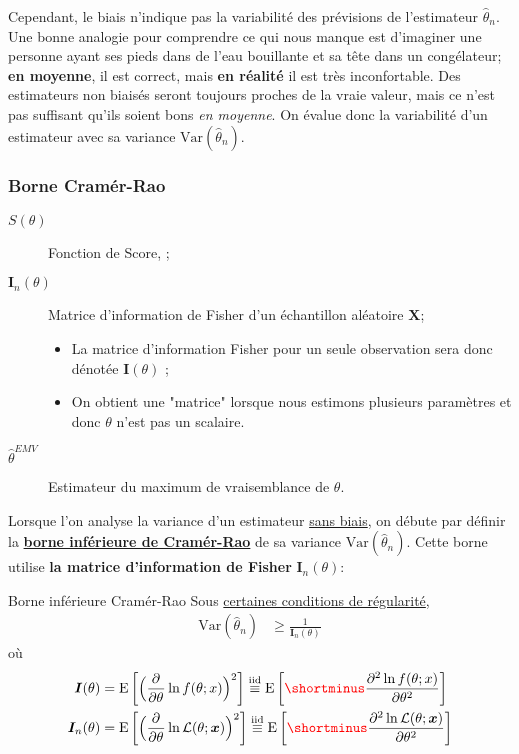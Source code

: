 \documentclass[10pt, french]{article}
\begin{document}
\begin{multicols*}{2}
Cependant, le biais n'indique pas la variabilité des prévisions de l'estimateur $\hat{\theta}_{n}$. Une bonne analogie pour comprendre ce qui nous manque est d’imaginer une personne ayant ses pieds dans de l'eau bouillante et sa tête dans un congélateur; \textbf{en moyenne}, il est correct, mais \textbf{en réalité} il est très inconfortable. Des estimateurs non biaisés seront toujours proches de la vraie valeur, mais ce n'est pas suffisant qu'ils soient bons \textit{en moyenne}. On évalue donc la variabilité d'un estimateur avec sa variance $\text{Var}(\hat{\theta}_{n})$.

\subsubsection{Borne Cramér-Rao}
\label{sec:cramer_rao}

\begin{distributions}[Notation]
\begin{description}
	\item[$S(\theta)$]	Fonction de Score, ;
	\item[$\bm{I}_{n}(\theta)$]	Matrice d'information de Fisher d'un échantillon aléatoire $\bm{X}$;
		\begin{itemize}
		\item	La matrice d'information Fisher pour un seule observation sera donc dénotée $\bm{I}(\theta)$ ;
		\item	On obtient une "matrice" lorsque nous estimons plusieurs paramètres et donc $\theta$ n'est pas un scalaire.
		\end{itemize}
	\item[$\hat{\theta}^{EMV}$]	Estimateur du maximum de vraisemblance de $\theta$.
\end{description}
\end{distributions}

Lorsque l'on analyse la variance d'un estimateur \underline{sans biais}, on débute par définir la \hyperlink{cramer-rao}{\textbf{borne inférieure de Cramér-Rao}} de sa variance $\text{Var}(\hat{\theta}_{n})$. Cette borne utilise \textbf{la matrice d'information de Fisher} $\bm{I}_{n}(\theta)$:

\begin{algo}{\hypertarget{cramer-rao}{Borne inférieure Cramér-Rao}}
Sous \hyperlink{reg_cond}{\color{blue!40!green!80!black}certaines conditions de régularité},
\begin{align*}
	\text{Var}(\hat{\theta}_{n}) 
	&\geq	\frac{1}{\bm{I}_{n}(\theta)}
\end{align*}
où
\begin{align*}
	\bm{I}(\theta) 
	&=	\text{E}\left[\Big(\deriv{\theta}{} \ln f(\theta; x)\Big)^{2}\right]	
	\overset{\text{iid}}{\equiv}	\text{E}\left[{\color{red}\shortminus}\deriv[2]{\theta}{\ln f(\theta; x)}	\right]	\\
	\bm{I}_{n}(\theta) 
	&=	\text{E}\left[\Big(\deriv{\theta}{} \ln \mathcal{L}(\theta; \bm{x})\Big)^{2}\right]	
	\overset{\text{iid}}{\equiv}	\text{E}\left[{\color{red}\shortminus}\deriv[2]{\theta}{\ln \mathcal{L}(\theta; \bm{x})}\right]	
\end{align*}

\end{algo}
\end{multicols*}
\end{document}
